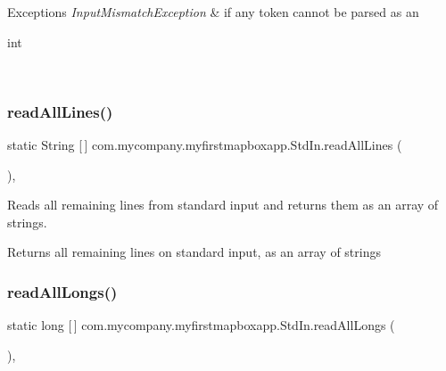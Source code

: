 \begin{DoxyExceptions}{Exceptions}
{\em Input\+Mismatch\+Exception} & if any token cannot be parsed as an
\begin{DoxyCode}
\textcolor{keywordtype}{int} 
\end{DoxyCode}
 \\
\hline
\end{DoxyExceptions}
\mbox{\label{classcom_1_1mycompany_1_1myfirstmapboxapp_1_1_std_in_af7b0715608eef376da78fb7f2b8c5a27}} 
\subsubsection{\texorpdfstring{read\+All\+Lines()}{readAllLines()}}
{\footnotesize\ttfamily static String \mbox{[}$\,$\mbox{]} com.\+mycompany.\+myfirstmapboxapp.\+Std\+In.\+read\+All\+Lines (\begin{DoxyParamCaption}{ }\end{DoxyParamCaption})\hspace{0.3cm}{\ttfamily [inline]}, {\ttfamily [static]}}

Reads all remaining lines from standard input and returns them as an array of strings. \begin{DoxyReturn}{Returns}
all remaining lines on standard input, as an array of strings 
\end{DoxyReturn}
\mbox{\label{classcom_1_1mycompany_1_1myfirstmapboxapp_1_1_std_in_abc6f94f59d71501875f127ce2c884b9b}} 
\subsubsection{\texorpdfstring{read\+All\+Longs()}{readAllLongs()}}
{\footnotesize\ttfamily static long \mbox{[}$\,$\mbox{]} com.\+mycompany.\+myfirstmapboxapp.\+Std\+In.\+read\+All\+Longs (\begin{DoxyParamCaption}{ }\end{DoxyParamCaption})\hspace{0.3cm}{\ttfamily [inline]}, {\ttfamily [static]}}

